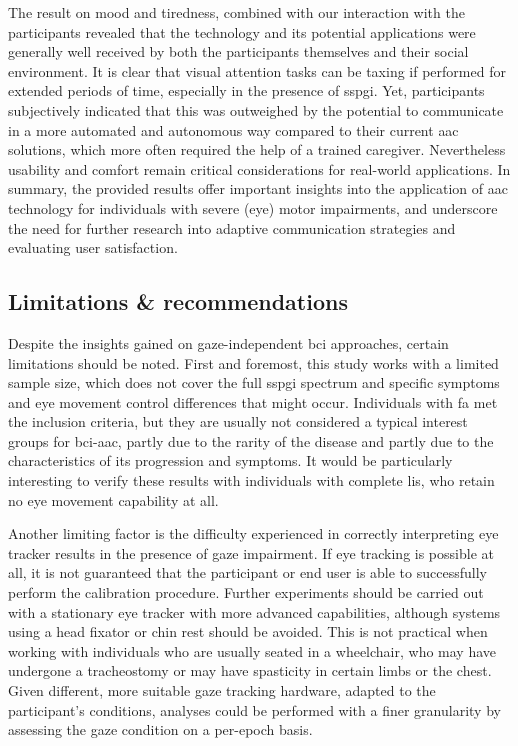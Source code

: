 \documentclass{article}
\begin{document}
The result on mood and tiredness, combined with our interaction with the participants revealed that the technology and its potential applications were generally well received
by both the participants themselves and their social environment.
It is clear that visual attention tasks can be taxing if performed for
extended periods of time, especially in the presence of \ac{sspgi}.
Yet, participants subjectively indicated that this was outweighed by the
potential to communicate in a more automated and autonomous way compared to
their current \ac{aac} solutions, which more often required the help of a trained caregiver.
Nevertheless usability and comfort remain critical considerations for
real-world applications.
In summary, the provided results offer important insights into the application
of \ac{aac} technology for individuals with severe
(eye) motor impairments, and underscore the need for further research into
adaptive communication strategies and evaluating user satisfaction.

\subsection{Limitations \& recommendations}

Despite the insights gained on gaze-independent \ac{bci} approaches, certain limitations
should be noted.
First and foremost, this study works with a limited sample size, which
does not cover the full \ac{sspgi} spectrum and specific symptoms and eye movement
control differences that might occur.
Individuals with \ac{fa} met the inclusion criteria, but they are usually not
considered a typical interest groups for \ac{bci}-\ac{aac}, partly due to the
rarity of the disease and partly due to the characteristics of its progression and symptoms.
It would be particularly interesting to verify these results with individuals with
complete \ac{lis}, who retain no eye movement capability at all.

Another limiting factor is the difficulty experienced in correctly interpreting eye
tracker results in the presence of gaze impairment.
If eye tracking is possible at all, it is not guaranteed that the participant or
end user is able to successfully perform the calibration procedure.
Further experiments should be carried out with a stationary eye tracker with
more advanced capabilities, although systems using a head fixator or chin rest
should be avoided.
This is not practical when working with individuals who are usually seated in
a wheelchair, who may have undergone a tracheostomy or may have spasticity
in certain limbs or the chest.
Given different, more suitable gaze tracking hardware, adapted to the participant's
conditions, analyses could be performed with a finer granularity by assessing
the gaze condition on a per-epoch basis.
\end{document}

